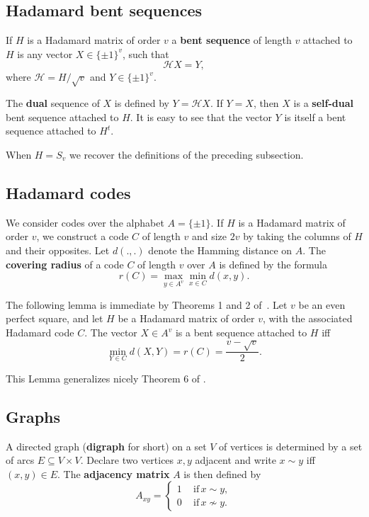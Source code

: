 \documentclass[12pt]{article}
\begin{document}
\subsection{Hadamard bent sequences}

If $H$ is a Hadamard matrix of order $v$ a {\bf bent sequence} of length $v$ attached to $H$ is any vector $X \in \{\pm 1\}^v$, such that
$$\mathcal{H}X=Y, $$
where  $\mathcal{H}=H/\sqrt{v}$ and  $Y \in \{\pm 1\}^v$.

The {\bf dual} sequence of $X$ is defined by $Y=\mathcal{H}X$. If $Y=X$, then $X$ is a {\bf self-dual} bent sequence attached to $H$. It is easy to see that the vector $Y$ is itself a bent sequence attached to $H^t$.


When $H=S_v$ we recover the definitions of the preceding subsection.
\subsection{Hadamard codes}

We consider codes over the alphabet $A=\{ \pm 1\}$. If $H$ is a Hadamard matrix of order $v$, we construct a code $C$ of length $v$ and size $2v$ by taking
the columns of $H$ and their opposites. Let $d(.,.)$ denote the Hamming distance on $A$.
The {\bf covering radius} of a code $C$ of length $v$ over $A$ is defined by the formula
$$r(C)= \max_{y \in A^v}\min_{x \in C} d(x,y). $$

The following lemma is immediate by Theorems 1 and 2 of~\cite{SCGR:2021isit}.
{\lem \label{CR} Let $v$ be an even perfect square, and let $H$ be a Hadamard matrix of order $v$, with the associated Hadamard code $C$.
The vector $X \in A^v$ is a bent sequence attached to $H$ iff
$$\min_{Y \in C} d(X,Y)=r(C)=\frac{v-\sqrt{v}}{2} . $$}

This Lemma generalizes nicely Theorem 6 of \cite[Chap. 14]{MWS}.
\subsection{Graphs}
A directed graph ({\bf digraph} for short)  on a set $V$ of vertices is determined by a set of arcs $E \subseteq V\times V$.
Declare two vertices $x,y$ adjacent and write $ x\sim y$  iff $(x,y) \in E$. The {\bf adjacency matrix} $A$ is then  defined by
$$A_{xy} = \begin{cases}
           1 \,\quad \mbox{if} \,   x\sim y, \\
           0 \,\quad \mbox{if} \,  x\nsim y.
          \end{cases}$$
\end{document}
